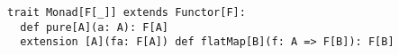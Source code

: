 \begin{algorithm}

\begin{verbatim}
trait Monad[F[_]] extends Functor[F]:
  def pure[A](a: A): F[A]
  extension [A](fa: F[A]) def flatMap[B](f: A => F[B]): F[B]
\end{verbatim}

\caption{Monad type class in Scala 3 %
\label{monad:scala}}
\end{algorithm}